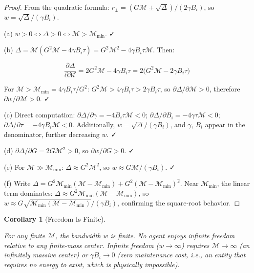 \documentclass[11pt]{article}
\theoremstyle{plain}
\newtheorem{corollary}[theorem]{Corollary}
\theoremstyle{definition}
\theoremstyle{remark}
\begin{document}
\begin{proof}
From the quadratic formula: $r_\pm = (G\mathcal{M} \pm \sqrt{\Delta})/(2\gamma B_i)$, so $w = \sqrt{\Delta}/(\gamma B_i)$.

(a) $w > 0 \iff \Delta > 0 \iff \mathcal{M} > \mathcal{M}_{\min}$. ✓

(b) $\Delta = \mathcal{M}(G^2\mathcal{M} - 4\gamma B_i \tau) = G^2\mathcal{M}^2 - 4\gamma B_i \tau \mathcal{M}$. Then:

$$\frac{\partial \Delta}{\partial \mathcal{M}} = 2G^2\mathcal{M} - 4\gamma B_i \tau = 2\bigl(G^2\mathcal{M} - 2\gamma B_i \tau\bigr)$$

For $\mathcal{M} > \mathcal{M}_{\min} = 4\gamma B_i \tau/G^2$: $G^2\mathcal{M} > 4\gamma B_i \tau > 2\gamma B_i \tau$, so $\partial\Delta/\partial\mathcal{M} > 0$, therefore $\partial w/\partial\mathcal{M} > 0$. ✓

(c) Direct computation: $\partial\Delta/\partial\gamma = -4B_i\tau\mathcal{M} < 0$; $\partial\Delta/\partial B_i = -4\gamma\tau\mathcal{M} < 0$; $\partial\Delta/\partial\tau = -4\gamma B_i \mathcal{M} < 0$. Additionally, $w = \sqrt{\Delta}/(\gamma B_i)$, and $\gamma$, $B_i$ appear in the denominator, further decreasing $w$. ✓

(d) $\partial\Delta/\partial G = 2G\mathcal{M}^2 > 0$, so $\partial w / \partial G > 0$. ✓

(e) For $\mathcal{M} \gg \mathcal{M}_{\min}$: $\Delta \approx G^2\mathcal{M}^2$, so $w \approx G\mathcal{M}/(\gamma B_i)$. ✓

(f) Write $\Delta = G^2\mathcal{M}_{\min}(\mathcal{M} - \mathcal{M}_{\min}) + G^2(\mathcal{M} - \mathcal{M}_{\min})^2$. Near $\mathcal{M}_{\min}$, the linear term dominates: $\Delta \approx G^2\mathcal{M}_{\min}(\mathcal{M} - \mathcal{M}_{\min})$, so $w \approx G\sqrt{\mathcal{M}_{\min}(\mathcal{M} - \mathcal{M}_{\min})}/(\gamma B_i)$, confirming the square-root behavior.
\end{proof}

\begin{corollary}[Freedom Is Finite]
\label{cor-freedom-is-finite}

For any finite $\mathcal{M}$, the bandwidth $w$ is finite. No agent enjoys infinite freedom relative to any finite-mass center. Infinite freedom ($w \to \infty$) requires $\mathcal{M} \to \infty$ (an infinitely massive center) or $\gamma B_i \to 0$ (zero maintenance cost, i.e., an entity that requires no energy to exist, which is physically impossible).
\end{corollary}
\end{document}
